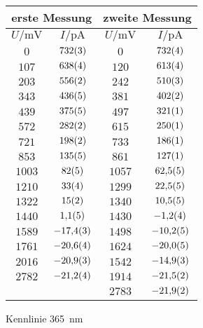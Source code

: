 \begin{figure}[htbp]
   \centering
\caption{Kennlinie \SI{365}{nm}}
\begin{tabular}{cc||cc}
\hline\multicolumn{2}{c||}{erste Messung} & \multicolumn{2}{c}{zweite Messung}\\

\hline
$U / \unit{\milli\volt}$ & $I / \unit{\pico\ampere}$ & $U / \unit{\milli\volt}$ & $I / \unit{\pico\ampere}$ \\ 
\hline
$\num{0}$ & $\num{732\pm 3}$ & $\num{0}$ & $\num{732\pm 4}$ \\
$\num{107}$ & $\num{638\pm 4}$ & $\num{120}$ & $\num{613\pm 4}$ \\
$\num{203}$ & $\num{556\pm 2}$ & $\num{242}$ & $\num{510\pm 3}$ \\
$\num{343}$ & $\num{436\pm 5}$ & $\num{381}$ & $\num{402\pm 2}$ \\
$\num{439}$ & $\num{375\pm 5}$ & $\num{497}$ & $\num{321\pm 1}$ \\
$\num{572}$ & $\num{282\pm 2}$ & $\num{615}$ & $\num{250\pm 1}$ \\
$\num{721}$ & $\num{198\pm 2}$ & $\num{733}$ & $\num{186\pm 1}$ \\
$\num{853}$ & $\num{135\pm 5}$ & $\num{861}$ & $\num{127\pm 1}$ \\
$\num{1003}$ & $\num{82\pm 5}$ & $\num{1057}$ & $\num{62.5\pm 0.5}$ \\
$\num{1210}$ & $\num{33\pm 4}$ & $\num{1299}$ & $\num{22.5\pm 0.5}$ \\
$\num{1322}$ & $\num{15\pm 2}$ & $\num{1340}$ & $\num{10.5\pm 0.5}$ \\
$\num{1440}$ & $\num{1.1\pm 0.5}$ & $\num{1430}$ & $\num{-1.2\pm 0.4}$ \\
$\num{1589}$ & $\num{-17.4\pm 0.3}$ & $\num{1498}$ & $\num{-10.2\pm 0.5}$ \\
$\num{1761}$ & $\num{-20.6\pm 0.4}$ & $\num{1624}$ & $\num{-20.0\pm 0.5}$ \\
$\num{2016}$ & $\num{-20.9\pm 0.3}$ & $\num{1542}$ & $\num{-14.9\pm 0.3}$ \\
$\num{2782}$ & $\num{-21.2\pm 0.4}$ & $\num{1914}$ & $\num{-21.5\pm 0.2}$ \\
   &    & $\num{2783}$ & $\num{-21.9\pm 0.2}$ \\
\hline\end{tabular}
\label{kennlinie_365nm}
\end{figure}